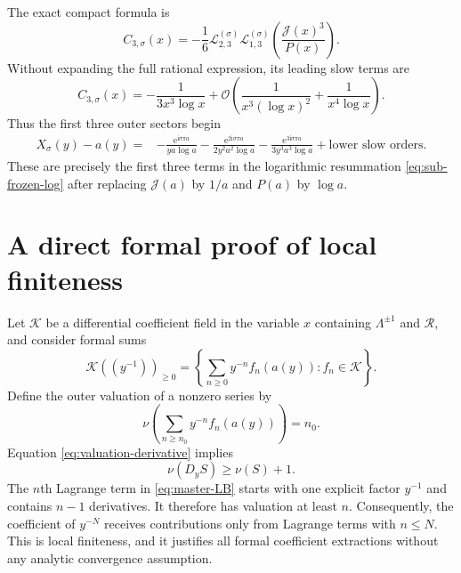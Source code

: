 \documentclass[11pt,a4paper]{article}
\numberwithin{equation}{section}
\theoremstyle{definition}
\theoremstyle{remark}
\newcommand{\e}{\mathrm e}
\newcommand{\ii}{\mathrm i}
\newcommand{\Ord}{\mathcal O}
\newcommand{\Tail}{\mathcal J}
\newcommand{\Lam}{\Lambda}
\newcommand{\Res}{\mathcal R}
\begin{document}
The exact compact formula is
\begin{equation}\label{eq:C3-operator}
 C_{3,\sigma}(x)=-\frac16
 \mathcal L^{(\sigma)}_{2,3}
 \mathcal L^{(\sigma)}_{1,3}
 \left(\frac{\Tail(x)^3}{P(x)}\right).
\end{equation}
Without expanding the full rational expression, its leading slow terms are
\begin{equation}\label{eq:C3-leading}
 C_{3,\sigma}(x)
 =-\frac1{3x^3\log x}
 +\Ord\!\left(\frac1{x^3(\log x)^2}
              +\frac1{x^4\log x}\right).
\end{equation}
Thus the first three outer sectors begin
\begin{align}
 X_\sigma(y)-a(y)={}&
 -\frac{\e^{\ii\sigma\pi a}}{ya\log a}
 -\frac{\e^{2\ii\sigma\pi a}}{2y^2a^2\log a}
 -\frac{\e^{3\ii\sigma\pi a}}{3y^3a^3\log a}
 +\text{lower slow orders}.
 \label{eq:first-three-leaders}
\end{align}
These are precisely the first three terms in the logarithmic resummation
\eqref{eq:sub-frozen-log} after replacing $\Tail(a)$ by $1/a$ and $P(a)$ by
$\log a$.

\section{A direct formal proof of local finiteness}
\label{app:local-finiteness}

Let $\mathscr K$ be a differential coefficient field in the variable $x$
containing $\Lam^{\pm1}$ and $\Res$, and consider formal sums
\begin{equation}\label{eq:formal-ring}
 \mathscr K((y^{-1}))_{\ge0}
 =\left\{\sum_{n\ge0}y^{-n}f_n(a(y)):f_n\in\mathscr K\right\}.
\end{equation}
Define the outer valuation of a nonzero series by
\begin{equation}\label{eq:outer-valuation}
 \nu\left(\sum_{n\ge n_0}y^{-n}f_n(a(y))\right)=n_0.
\end{equation}
Equation \eqref{eq:valuation-derivative} implies
\begin{equation}\label{eq:valuation-gain}
 \nu(D_yS)\ge\nu(S)+1.
\end{equation}
The $n$th Lagrange term in \eqref{eq:master-LB} starts with one explicit
factor $y^{-1}$ and contains $n-1$ derivatives.  It therefore has valuation
at least $n$.  Consequently, the coefficient of $y^{-N}$ receives
contributions only from Lagrange terms with $n\le N$.  This is local
finiteness, and it justifies all formal coefficient extractions without any
analytic convergence assumption.
\end{document}
